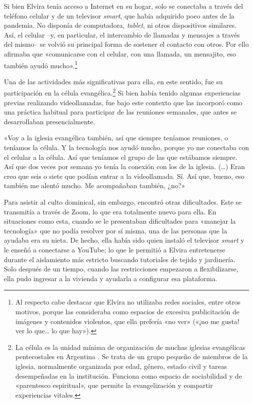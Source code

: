\begin{refsection}
Si bien Elvira tenía acceso a Internet en su hogar, solo se conectaba a través del teléfono celular y de un televisor \emph{smart}, que había adquirido poco antes de la pandemia. No disponía de computadora, \emph{tablet}, ni otros dispositivos similares. Así, el celular –y, en particular, el intercambio de llamadas y mensajes a través del mismo– se volvió su principal forma de sostener el contacto con otros. Por ello afirmaba que «comunicarse con el celular, con una llamada, un mensajito, eso también ayudó mucho».\footnote{Al respecto cabe destacar que Elvira no utilizaba redes sociales,
        entre otros motivos, porque las consideraba como espacios de excesiva
        publicitación de imágenes y contenidos violentos, que ella prefería
        «no ver» («¡no me gusta! ver lo que… lo que
        hay»).}

Una de las actividades más significativas para ella, en este sentido, fue su participación en la célula evangélica.\footnote{La célula es la unidad mínima de organización de muchas iglesias
        evangélicas pentecostales en Argentina
        \protect\parencite{4170-ALGRANTI2010}. Se trata de un grupo
        pequeño de miembros de la iglesia, normalmente organizada por edad,
        género, estado civil y tareas desempeñadas en la institución. Funciona
        como espacio de sociabilidad y de «parentesco
        espiritual», que permite la evangelización y compartir
        experiencias vitales.} Si bien había tenido algunas experiencias previas realizando videollamadas, fue bajo este contexto que las incorporó como una práctica habitual para participar de las reuniones semanales, que antes se desarrollaban presencialmente.


\begin{gbcita}
«Voy a la iglesia evangélica también, así que siempre teníamos reuniones, o teníamos la célula. Y la tecnología nos ayudó mucho, porque yo me conectaba con el celular a la célula. Así que teníamos el grupo de las que estábamos siempre. Así que dos veces por semana yo tenía la conexión con los de la iglesia. (…) Eran creo que seis o siete que podían entrar a la videollamada. Sí. Así que, bueno, eso también me alentó mucho. Me acompañaban también, ¿no?»

\end{gbcita}

Para asistir al culto dominical, sin embargo, encontró otras dificultades. Este se transmitía a través de Zoom, lo que era totalmente nuevo para ella. En situaciones como esta, cuando se le presentaban dificultades para «manejar la tecnología» que no podía resolver por sí misma, una de las personas que la ayudaba era su nieta. De hecho, ella había sido quien instaló el televisor \emph{smart} y le enseñó a conectarse a YouTube; lo que le permitió a Elvira entretenerse durante el aislamiento más estricto buscando tutoriales de tejido y jardinería. Solo después de un tiempo, cuando las restricciones empezaron a flexibilizarse, ella pudo ingresar a la vivienda y ayudarla a configurar esa plataforma.



\end{refsection}
